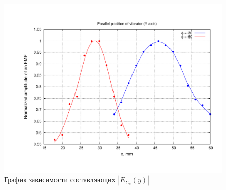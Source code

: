 \documentclass[11pt,a4paper,oneside, titlepage,reqno]{amsproc}
\begin{document}
\begin{figure}[h!]
    \begin{center}
        \includegraphics[width=\textwidth]{plot4.pdf}
    \end{center}
    \vspace {-20 pt}
    \caption{График зависимости составляющих $|\overline{E}_{\Sigma_z}(y)|$}
    \label{fig:plot4}
\end{figure}
\end{document}
